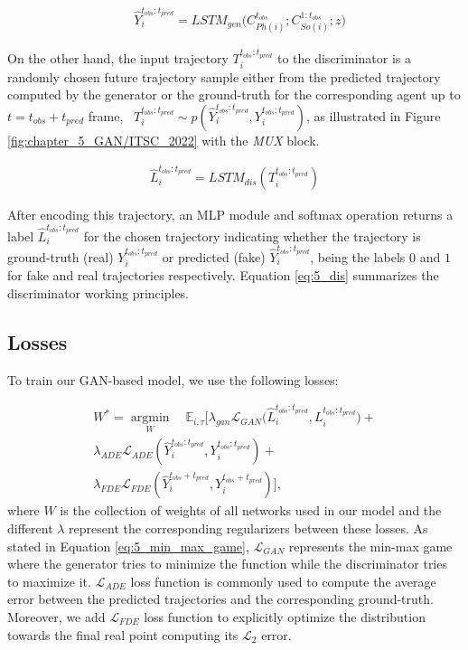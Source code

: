 \begin{eqnarray}
	\label{eq:5_gen_dec}
	& \hat{Y}_i^{t_{obs}:t_{pred}} = LSTM_{gen}\big(C_{Ph(i)}^{t_{obs}}; C_{So(i)}^{1:t_{obs}}; z\big)
\end{eqnarray}

On the other hand, the input trajectory $T_i^{t_{obs}:t_{pred}}$ to the discriminator is a randomly chosen future trajectory sample either from the predicted trajectory computed by the generator or the ground-truth for the corresponding agent up to $t = t_{obs} + t_{pred}$ frame, \ie \ $T_i^{t_{obs}:t_{pred}}\sim p(\hat{Y}_i^{t_{obs}:t_{pred}},Y_i^{t_{obs}:t_{pred}})$, as illustrated in Figure \ref{fig:chapter_5_GAN/ITSC_2022} with the \textit{MUX} block.

\begin{eqnarray}
	\label{eq:5_dis}
	\hat{L}_{i}^{t_{obs}:t_{pred}} = LSTM_{dis}(T_i^{t_{obs}:t_{pred}})
\end{eqnarray}

After encoding this trajectory, an \ac{MLP} module and softmax operation returns a label $\hat{L}_{i}^{t_{obs}:t_{pred}}$ for the chosen trajectory indicating whether the trajectory is ground-truth (real) $Y_i^{t_{obs}:t_{pred}}$ or predicted (fake) $\hat{Y}_i^{t_{obs}:t_{pred}}$, being the labels $0$ and $1$ for fake and real trajectories respectively. Equation \ref{eq:5_dis} summarizes the discriminator working principles. 

\subsection{Losses}
\label{subsec:5_losses}

To train our \ac{GAN}-based model, we use the following losses:

\begin{eqnarray}
	\label{eq:obj}
	W^* =\operatorname*{argmin}_W \quad\mathbb{E}_{i,\tau}[\lambda_{gan} \mathcal{L}_{GAN}\big(\hat{L}_{i}^{t_{obs}:t_{pred}}, L_{i}^{t_{obs}:t_{pred}} \big)+ \nonumber\\
	\lambda_{ADE} \mathcal{L}_{ADE}(\hat{Y}_i^{t_{obs}:t_{pred}},Y_i^{t_{obs}:t_{pred}})+ \nonumber\\
	\lambda_{FDE} \mathcal{L}_{FDE}(\hat{Y}_i^{t_{obs}+t_{pred}},Y_i^{t_{obs}+t_{pred}})],
\end{eqnarray}
%
where $W$ is the collection of weights of all networks used in our model and the different $\lambda$ represent the corresponding regularizers between these losses. As stated in Equation \ref{eq:5_min_max_game}, $\mathcal{L}_{GAN}$ represents the min-max game where the generator tries to minimize the function while the discriminator tries to maximize it. $\mathcal{L}_{ADE}$ loss function is commonly used to compute the average error between the predicted trajectories and the corresponding ground-truth. Moreover, we add $\mathcal{L}_{FDE}$ loss function to explicitly optimize the distribution towards the final real point computing its $\mathcal{L}_2$ error.

